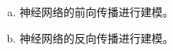 \begin{enumerate}[(1)]


  \begin{enumerate}[(a)]
    \item 神经网络的前向传播进行建模。
    \item 神经网络的反向传播进行建模。

\end{enumerate}
\end{enumerate}

